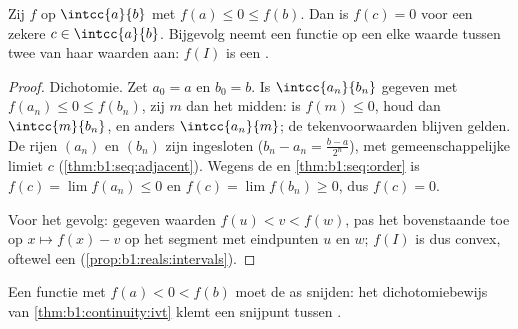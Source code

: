 \begin{theorem}[Tussenwaardestelling]\label{thm:b1:continuity:ivt}
Zij $f$  op $\intcc{a}{b}$ met $f(a) \leq 0 \leq f(b)$. Dan is
$f(c) = 0$ voor een zekere $c \in \intcc{a}{b}$. Bijgevolg neemt een
 functie op een  elke waarde tussen twee van haar waarden
aan: $f(I)$ is een .
\end{theorem}

\begin{proof}
Dichotomie. Zet $a_0 = a$ en $b_0 = b$. Is $\intcc{a_n}{b_n}$ gegeven met
$f(a_n) \leq 0 \leq f(b_n)$, zij $m$ dan het midden: is $f(m) \leq 0$,
houd dan $\intcc{m}{b_n}$, en anders $\intcc{a_n}{m}$; de
tekenvoorwaarden blijven gelden. De rijen $(a_n)$ en $(b_n)$ zijn
ingesloten ($b_n - a_n = \frac{b-a}{2^n}$), met gemeenschappelijke limiet
$c$ (\cref{thm:b1:seq:adjacent}). Wegens de  en
\cref{thm:b1:seq:order} is $f(c) = \lim f(a_n) \leq 0$ en $f(c) = \lim
f(b_n) \geq 0$, dus $f(c) = 0$.

Voor het gevolg: gegeven waarden $f(u) < v < f(w)$, pas het bovenstaande
toe op $x \mapsto f(x) - v$ op het segment met eindpunten $u$ en $w$;
$f(I)$ is dus convex, oftewel een 
(\cref{prop:b1:reals:intervals}).
\end{proof}

\begin{omfigure}

{\small Een  functie met $f(a) < 0 < f(b)$ moet de as snijden:
het dichotomiebewijs van \cref{thm:b1:continuity:ivt} klemt een snijpunt
tussen .}
\end{omfigure}

